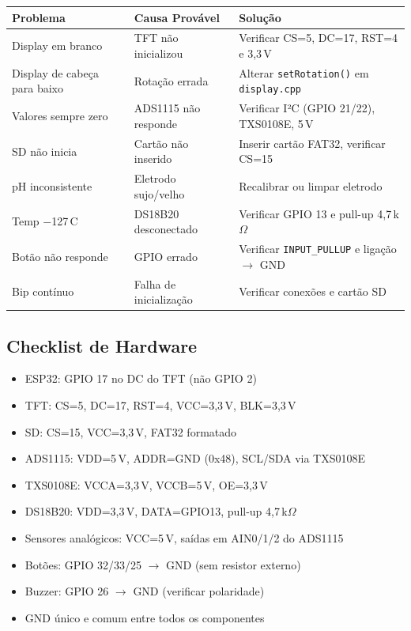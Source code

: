 \documentclass[12pt,a4paper]{article}
\begin{document}
\begin{tabularx}{\textwidth}{l l X}
\toprule
\textbf{Problema} & \textbf{Causa Provável} & \textbf{Solução} \\
\midrule
Display em branco & TFT não inicializou & Verificar CS=5, DC=17, RST=4 e 3,3\,V \\
Display de cabeça para baixo & Rotação errada & Alterar \texttt{setRotation()} em \texttt{display.cpp} \\
Valores sempre zero & ADS1115 não responde & Verificar I²C (GPIO 21/22), TXS0108E, 5\,V \\
SD não inicia & Cartão não inserido & Inserir cartão FAT32, verificar CS=15 \\
pH inconsistente & Eletrodo sujo/velho & Recalibrar ou limpar eletrodo \\
Temp $-$127\,C & DS18B20 desconectado & Verificar GPIO 13 e pull-up 4,7\,k$\Omega$ \\
Botão não responde & GPIO errado & Verificar \texttt{INPUT\_PULLUP} e ligação $\rightarrow$ GND \\
Bip contínuo & Falha de inicialização & Verificar conexões e cartão SD \\
\bottomrule
\end{tabularx}

\subsection{Checklist de Hardware}

\begin{itemize}[nosep]
  \item[$\square$] ESP32: GPIO 17 no DC do TFT (não GPIO 2)
  \item[$\square$] TFT: CS=5, DC=17, RST=4, VCC=3,3\,V, BLK=3,3\,V
  \item[$\square$] SD: CS=15, VCC=3,3\,V, FAT32 formatado
  \item[$\square$] ADS1115: VDD=5\,V, ADDR=GND (0x48), SCL/SDA via TXS0108E
  \item[$\square$] TXS0108E: VCCA=3,3\,V, VCCB=5\,V, OE=3,3\,V
  \item[$\square$] DS18B20: VDD=3,3\,V, DATA=GPIO13, pull-up 4,7\,k$\Omega$
  \item[$\square$] Sensores analógicos: VCC=5\,V, saídas em AIN0/1/2 do ADS1115
  \item[$\square$] Botões: GPIO 32/33/25 $\rightarrow$ GND (sem resistor externo)
  \item[$\square$] Buzzer: GPIO 26 $\rightarrow$ GND (verificar polaridade)
  \item[$\square$] GND único e comum entre todos os componentes
\end{itemize}
\end{document}
